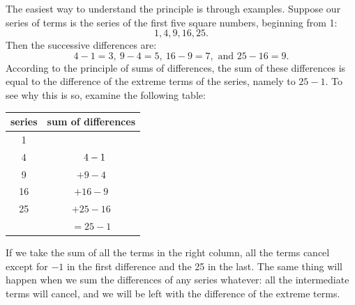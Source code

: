 \documentclass[twoside,openright]{article}
\begin{document}
The easiest way to understand the principle is through examples.  Suppose our series of terms is the series of the first five square numbers, beginning from 1:
$$1, 4, 9, 16, 25.$$
Then the successive differences are:
$$4-1= 3,\ 9-4 =5,\ 16-9=7, \mbox{ and } 25-16 = 9.$$
According to the principle of sums of differences, the sum of these differences is equal to the difference of the extreme terms of the series, namely to $25-1$.  To see why this is so, examine the following table:
\begin{center}
\begin{tabular}{c|c}
  series & sum of differences \\ \hline
  1 &  \\
  4 & $ \hspace*{.7em}4-1$ \\
  9 & $ +9-4$ \\
  16 & $+ 16-9 $ \\
  25 & $ + 25-16$ \\ \hline
       & $ = 25-1$
\end{tabular}
\end{center}
If we take the sum of all the terms in the right column, all the terms cancel except for $-1$ in the first difference and the 25 in the last.  The same thing will happen when we sum the differences of any series whatever: all the intermediate terms will cancel, and we will be left with the difference of the extreme terms.
\end{document}
